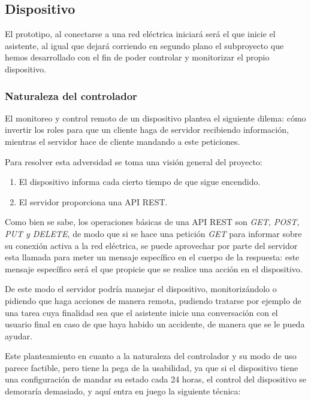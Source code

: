 \subsection{Dispositivo}

El prototipo, al conectarse a una red eléctrica iniciará será el que inicie el asistente, al igual que dejará corriendo en segundo plano el subproyecto que hemos desarrollado con el fin de poder controlar y monitorizar el propio dispositivo.

    \subsubsection{Naturaleza del controlador}
    
        El monitoreo y control remoto de un dispositivo plantea el siguiente dilema: cómo invertir los roles para que un cliente haga de servidor recibiendo información, mientras el servidor hace de cliente mandando a este peticiones.
        
        Para resolver esta adversidad se toma una visión general del proyecto:
        \begin{enumerate}
            \item El dispositivo informa cada cierto tiempo de que sigue encendido.
            \item El servidor proporciona una API REST.
        \end{enumerate}
        
        Como bien se sabe, los operaciones básicas de una API REST son \textit{GET, POST, PUT y DELETE}, de modo que si se hace una petición \textit{GET} para informar sobre su conexión activa a la red eléctrica, se puede aprovechar por parte del servidor esta llamada para meter un mensaje específico en el cuerpo de la respuesta: este mensaje específico será el que propicie que se realice una acción en el dispositivo.
        
        De este modo el servidor podría manejar el dispositivo, monitorizándolo o pidiendo que haga acciones de manera remota, pudiendo tratarse por ejemplo de una tarea cuya finalidad sea que el asistente inicie una conversación con el usuario final en caso de que haya habido un accidente, de manera que se le pueda ayudar.
        
        Este planteamiento en cuanto a la naturaleza del controlador y su modo de uso parece factible, pero tiene la pega de la usabilidad, ya que si el dispositivo tiene una configuración de mandar su estado cada 24 horas, el control del dispositivo se demoraría demasiado, y aquí entra en juego la siguiente técnica:
        
